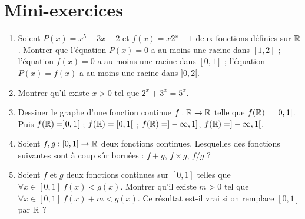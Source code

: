 \section{Mini-exercices}

\begin{frame}

\begin{miniexercice}
\begin{enumerate}
  \item Soient $P(x)=x^5-3x-2$ et $f(x)=x2^x-1$ deux fonctions définies sur $\mathbb{R}$. Montrer que
   l'équation $P(x)=0$ a au moins une racine dans $[1,2]$ ;
   l'équation $f(x)=0$ a au moins une racine dans $[0,1]$ ;
   l'équation $P(x)=f(x)$ a au moins une racine dans $]0,2[$.
  
  \item Montrer qu'il existe $x>0$ tel que $2^x+3^x=5^x$.
  
  \item Dessiner le graphe d'une fonction continue $f : \mathbb{R} \to \mathbb{R}$ telle que $f(\mathbb{R}) = [0,1]$.
  Puis $f(\mathbb{R})=]0,1[$ ; $f(\mathbb{R}) = [0,1[$ ; $f(\mathbb{R})= ]-\infty,1]$, $f(\mathbb{R})= ]-\infty,1[$.
  
  \item Soient $f,g : [0,1] \to \mathbb{R}$ deux fonctions continues. Lesquelles des fonctions suivantes
  sont à coup sûr bornées : $f+g$, $f\times g$, $f/g$ ?  
  
  \item Soient $f$ et $g$ deux fonctions continues sur $[0,1]$ telles que $\forall x\in [0,1] \ f(x)<g(x)$. 
  Montrer qu'il existe $m>0$ tel que $\forall x\in [0,1] \ f(x)+m<g(x)$. Ce résultat 
  est-il vrai si on remplace $[0,1]$ par $\mathbb{R}$ ?
  
\end{enumerate}
\end{miniexercice}

\end{frame}

